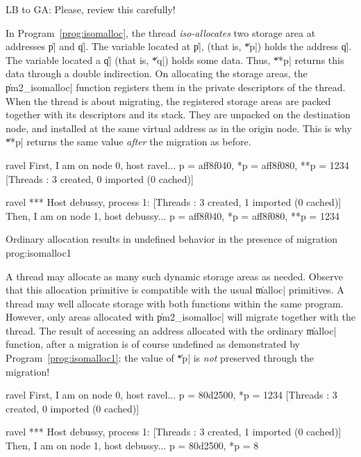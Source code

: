 \begin{note}
  LB to GA: Please, review this carefully!
\end{note}

In Program~\ref{prog:isomalloc}, the thread \emph{iso-allocates}
two storage area at addresses \|p| and \|q|. The variable located at
\|p|, (that is, \|*p|) holds the address \|q|. The variable located a
\|q| (that is, \|*q|) holds some data. Thus, \|**p| returns this
data through a double indirection. On allocating the storage areas, the
\|pm2_isomalloc| function registers them in the private descriptors of
the thread. When the thread is about migrating, the registered storage
areas are packed together with its descriptors and its stack. They are
unpacked on the destination node, and installed at the same virtual
address as in the origin node. This is why \|**p| returns the same
value \emph{after} the migration as before. 
\begin{shell}
ravel%
First, I am on node 0, host ravel...
p = aff8f040, *p = aff8f080, **p = 1234
[Threads : 3 created, 0 imported (0 cached)]

ravel%
*** Host debussy, process 1:
[Threads : 3 created, 1 imported (0 cached)]
Then, I am on node 1, host debussy...
p = aff8f040, *p = aff8f080, **p = 1234
\end{shell}

 {Ordinary allocation results in
  undefined behavior in the presence of
  migration} {prog:isomalloc1}

A thread may allocate as many such dynamic storage areas as
needed. Observe that this allocation primitive is compatible with the
usual \|malloc| primitives. A thread may well allocate storage with
both functions within the same program. However, only areas allocated
with \|pm2_isomalloc| will migrate together with the thread. The
result of accessing an address allocated with the ordinary \|malloc|
function, after a migration is of course undefined as demonstrated by
Program~\ref{prog:isomalloc1}: the value of \|*p| is \emph{not}
preserved through the migration!
\begin{shell}
ravel%
First, I am on node 0, host ravel...
p = 80d2500, *p = 1234
[Threads : 3 created, 0 imported (0 cached)]

ravel%
*** Host debussy, process 1:
[Threads : 3 created, 1 imported (0 cached)]
Then, I am on node 1, host debussy...
p = 80d2500, *p = 8
\end{shell}

